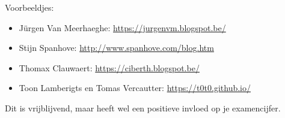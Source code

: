 Voorbeeldjes:

\begin{itemize}
\item Jürgen Van Meerhaeghe: \url{https://jurgenvm.blogspot.be/}
\item Stijn Spanhove: \url{http://www.spanhove.com/blog.htm}
\item Thomax Clauwaert: \url{https://ciberth.blogspot.be/}
\item Toon Lamberigts en Tomas Vercautter: \url{https://t0t0.github.io/}
\end{itemize}

Dit is vrijblijvend, maar heeft wel een positieve invloed op je examencijfer.

